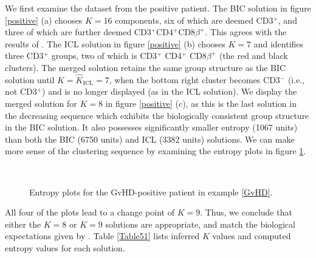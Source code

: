 \documentclass{uwstat572}
\newcommand*\estim[1]{\widehat{#1}}
\renewcommand\;{\,}
\begin{document}
We first examine the dataset from the positive patient.
The BIC solution in figure \ref{positive} (a) chooses $K = 16$ components, six of which are deemed CD3$^+$, and three of which are further deemed CD3$^+$CD4$^+$CD8$\beta^+$.
This agrees with the results of \cite{Brinkman07}.
The ICL solution in figure \ref{positive} (b) chooses $K = 7$ and identifies three CD3$^+$ groups, two of which is CD3$^+$ CD4$^+$ CD8$\beta^+$ (the red and black clusters).
The merged solution retains the same group structure as the BIC solution until $K = \estim K_\text{ICL} = 7$, when the bottom right cluster becomes CD3$^-$ (i.e., not CD3$^+$) and is no longer displayed (as in the ICL solution).
We display the merged solution for $K = 8$ in figure \ref{positive} (c), as this is the last solution in the decreasing sequence which exhibits the biologically consistent group structure in the BIC solution.
It also possesses significantly smaller entropy (1067 units) than both the BIC (6750 units) and ICL (3382 units) solutions.
We can make more sense of the clustering sequence by examining the entropy plots in figure \ref{Entropy5_1}.
\begin{figure}
\begin{center}
\\ \vspace{-1em}
\end{center}
\caption{Entropy plots for the GvHD-positive patient in example \ref{GvHD}.}
\label{Entropy5_1}
\end{figure}
All four of the plots lead to a change point of $K = 9$.
Thus, we conclude that either the $K = 8$ or $K = 9$ solutions are appropriate, and match the biological expectations given by \cite{Brinkman07}.
Table \ref{Table51} lists inferred $K$ values and computed entropy values for each solution.
\end{document}
